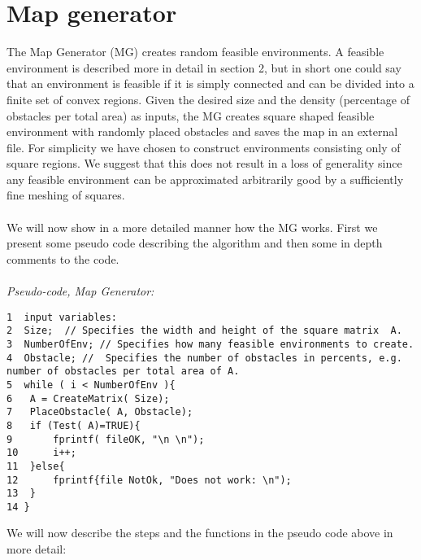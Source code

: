 \section{Map generator}
The Map Generator (MG) creates random feasible environments. A feasible environment is described more in detail in section 2, but in short one could say that an environment is feasible if it is simply connected and can be divided into a finite set of convex regions. Given the desired size and the density (percentage of obstacles per total area) as inputs, the MG creates square shaped feasible environment with randomly placed obstacles and saves the map in an external file. For simplicity we have chosen to construct environments consisting only of square regions. We suggest that this does not result in a loss of generality since any feasible environment can be approximated arbitrarily good by a sufficiently fine meshing of squares. \\
\\We will now show in a more detailed manner how the MG works. First we present some pseudo code describing the algorithm and then some in depth comments to the code.\\
\\\noindent\emph{Pseudo-code, Map Generator:}
\begin{verbatim}
1  input variables:
2  Size;  // Specifies the width and height of the square matrix  A.
3  NumberOfEnv; // Specifies how many feasible environments to create.
4  Obstacle; //  Specifies the number of obstacles in percents, e.g. 
number of obstacles per total area of A.
5  while ( i < NumberOfEnv ){
6  	A = CreateMatrix( Size); 
7  	PlaceObstacle( A, Obstacle);
8  	if (Test( A)=TRUE){ 
9 		fprintf( fileOK, "\n \n");
10 		i++;
11	}else{
12 		fprintf{file NotOk, "Does not work: \n");
13 	}
14 }
\end{verbatim}
We will now describe the steps and the functions in the pseudo code above in more detail:
